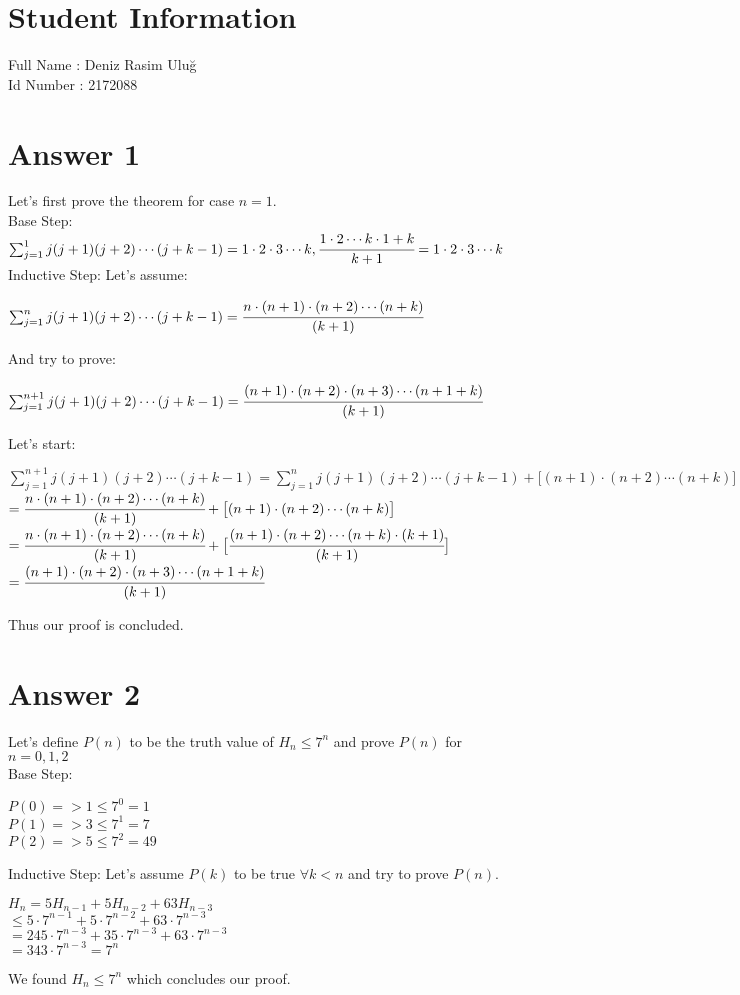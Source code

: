 \documentclass[12pt]{article}
\begin{document}
\section*{Student Information } 
Full Name : Deniz Rasim Uluğ  \\
Id Number : 2172088 \\

\section*{Answer 1}
Let's first prove the theorem for case $n=1$.\\
Base Step: $\sum_{j=1}^1 j(j+1)(j+2)\cdots (j+k-1)=1\cdot 2\cdot 3\cdots k, \cfrac{1\cdot 2\cdots k\cdot 1+k}{k+1}=1\cdot 2\cdot 3\cdots k$\\
Inductive Step: Let's assume:
\begin{center}
$\sum_{j=1}^n j(j+1)(j+2)\cdots (j+k-1)=\cfrac{n\cdot (n+1)\cdot (n+2)\cdots (n+k)}{(k+1)}$
\end{center}
And try to prove:
\begin{center}
$\sum_{j=1}^{n+1} j(j+1)(j+2)\cdots (j+k-1)=\cfrac{(n+1)\cdot (n+2)\cdot (n+3)\cdots (n+1+k)}{(k+1)}$
\end{center}
Let's start:
\begin{center}
$\sum_{j=1}^{n+1} j(j+1)(j+2)\cdots (j+k-1)=\sum_{j=1}^n j(j+1)(j+2)\cdots (j+k-1)+\big [(n+1)\cdot (n+2)\cdots (n+k) \big ]$\\
$=\cfrac{n\cdot (n+1)\cdot (n+2)\cdots (n+k)}{(k+1)}+\big [(n+1)\cdot (n+2)\cdots (n+k) \big ]$\\
$=\cfrac{n\cdot (n+1)\cdot (n+2)\cdots (n+k)}{(k+1)}+\big [\cfrac{(n+1)\cdot (n+2)\cdots (n+k)\cdot (k+1)}{(k+1)} \big ]$\\
$=\cfrac{(n+1)\cdot (n+2)\cdot (n+3)\cdots (n+1+k)}{(k+1)}$
\end{center}
Thus our proof is concluded.

\section*{Answer 2}
Let's define $P(n)$ to be the truth value of $H_n\leq 7^n$ and prove $P(n)$ for $n=0,1,2$\\
Base Step:
\begin{center}
$P(0)=> 1\leq 7^0=1$\\
$P(1)=> 3\leq 7^1=7$\\
$P(2)=> 5\leq 7^2=49$\\
\end{center}
Inductive Step: Let's assume $P(k)$ to be true $\forall k<n$ and try to prove $P(n)$.
\begin{center}
$H_n=5H_{n-1}+5H_{n-2}+63H_{n-3}$\\
$\leq 5\cdot 7^{n-1}+5\cdot 7^{n-2}+63\cdot 7^{n-3}$\\
$=245\cdot 7^{n-3}+ 35\cdot 7^{n-3}+63\cdot 7^{n-3}$\\
$=343\cdot 7^{n-3}=7^n$
\end{center}
We found $H_n\leq 7^n$ which concludes our proof.
\end{document}
